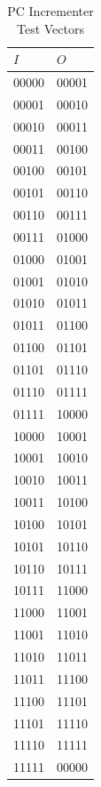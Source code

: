 \begin{table}[htbp]
    \centering
        \begin{tabular}{ll} \toprule
            $I$     & $O$   \\\midrule
            00000   & 00001 \\
            00001   & 00010 \\
            00010   & 00011 \\
            00011   & 00100 \\
            00100   & 00101 \\
            00101   & 00110 \\
            00110   & 00111 \\
            00111   & 01000 \\
            01000   & 01001 \\
            01001   & 01010 \\
            01010   & 01011 \\
            01011   & 01100 \\
            01100   & 01101 \\
            01101   & 01110 \\
            01110   & 01111 \\
            01111   & 10000 \\
            10000   & 10001 \\
            10001   & 10010 \\
            10010   & 10011 \\
            10011   & 10100 \\
            10100   & 10101 \\
            10101   & 10110 \\
            10110   & 10111 \\
            10111   & 11000 \\
            11000   & 11001 \\
            11001   & 11010 \\
            11010   & 11011 \\
            11011   & 11100 \\
            11100   & 11101 \\
            11101   & 11110 \\
            11110   & 11111 \\
            11111   & 00000 \\\bottomrule
        \end{tabular}
    \caption{PC Incrementer Test Vectors\label{tab:pcadder_vectors}}
\end{table}

